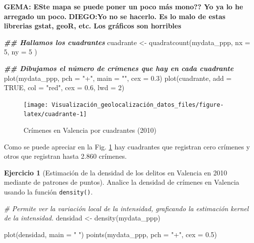 \documentclass[
]{book}
\newenvironment{Shaded}{\begin{snugshade}}{\end{snugshade}}
\newcommand{\AttributeTok}[1]{\textcolor[rgb]{0.77,0.63,0.00}{#1}}
\newcommand{\CommentTok}[1]{\textcolor[rgb]{0.56,0.35,0.01}{\textit{#1}}}
\newcommand{\ConstantTok}[1]{\textcolor[rgb]{0.00,0.00,0.00}{#1}}
\newcommand{\DecValTok}[1]{\textcolor[rgb]{0.00,0.00,0.81}{#1}}
\newcommand{\DocumentationTok}[1]{\textcolor[rgb]{0.56,0.35,0.01}{\textbf{\textit{#1}}}}
\newcommand{\FloatTok}[1]{\textcolor[rgb]{0.00,0.00,0.81}{#1}}
\newcommand{\FunctionTok}[1]{\textcolor[rgb]{0.00,0.00,0.00}{#1}}
\newcommand{\NormalTok}[1]{#1}
\newcommand{\OtherTok}[1]{\textcolor[rgb]{0.56,0.35,0.01}{#1}}
\newcommand{\StringTok}[1]{\textcolor[rgb]{0.31,0.60,0.02}{#1}}
\theoremstyle{definition}
\theoremstyle{definition}
\theoremstyle{definition}
\newtheorem{exercise}{Ejercicio}[chapter]
\theoremstyle{definition}
\theoremstyle{remark}
\begin{document}
\textbf{GEMA: ESte mapa se puede poner un poco más mono?? Yo ya lo he arregado un
poco.} \textbf{DIEGO:Yo no se hacerlo. Es lo malo de estas librerias gstat, geoR,
etc. Los gráficos son horribles}

\begin{Shaded}
\begin{Highlighting}[]
\DocumentationTok{\#\# Hallamos los cuadrantes}
\NormalTok{cuadrante }\OtherTok{\textless{}{-}} \FunctionTok{quadratcount}\NormalTok{(mydata\_ppp,}
  \AttributeTok{nx =} \DecValTok{5}\NormalTok{,}
  \AttributeTok{ny =} \DecValTok{5}
\NormalTok{)}

\DocumentationTok{\#\# Dibujamos el número de crímenes que hay en cada cuadrante}
\FunctionTok{plot}\NormalTok{(mydata\_ppp, }\AttributeTok{pch =} \StringTok{"+"}\NormalTok{, }\AttributeTok{main =} \StringTok{""}\NormalTok{, }\AttributeTok{cex =} \FloatTok{0.3}\NormalTok{)}
\FunctionTok{plot}\NormalTok{(cuadrante, }\AttributeTok{add =} \ConstantTok{TRUE}\NormalTok{, }\AttributeTok{col =} \StringTok{"red"}\NormalTok{, }\AttributeTok{cex =} \FloatTok{0.6}\NormalTok{, }\AttributeTok{lwd =} \DecValTok{2}\NormalTok{)}
\end{Highlighting}
\end{Shaded}

\begin{figure}

{\centering \texttt{[image: Visualización\_geolocalización\_datos\_files/figure-latex/cuadrante-1]} 

}

\caption{Crímenes en Valencia por cuadrantes (2010)}\label{fig:cuadrante}
\end{figure}

Como se puede apreciar en la Fig. \ref{fig:cuadrante} hay cuadrantes que
registran cero crímenes y otros que registran hasta 2.860 crímenes.

\begin{exercise}[Estimación de la densidad de los delitos en Valencia en 2010 mediante de patrones de puntos]
\protect\hypertarget{exr:ex33}{}\label{exr:ex33}Analice la densidad de crímenes en Valencia usando la función \texttt{density()}.
\end{exercise}

\begin{Shaded}
\begin{Highlighting}[]

\CommentTok{\# Permite ver la variación local de la intensidad, graficando la estimación kernel de la intensidad.}
\NormalTok{densidad }\OtherTok{\textless{}{-}} \FunctionTok{density}\NormalTok{(mydata\_ppp)}

\FunctionTok{plot}\NormalTok{(densidad, }\AttributeTok{main =} \StringTok{" "}\NormalTok{)}
\FunctionTok{points}\NormalTok{(mydata\_ppp, }\AttributeTok{pch =} \StringTok{"+"}\NormalTok{, }\AttributeTok{cex =} \FloatTok{0.5}\NormalTok{)}
\end{Highlighting}
\end{Shaded}
\end{document}
